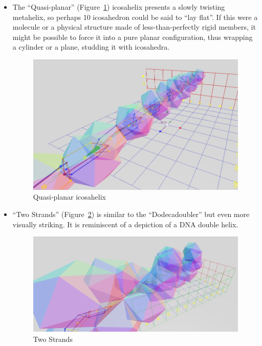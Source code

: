 \documentclass[mathematics,article,submit,pdftex,moreauthors]{Definitions/mdpi}
\begin{document}
\begin{itemize}
\item The ``Quasi-planar'' (Figure~\ref{fig:quasiplanar}) icosahelix presents a slowly twisting metahelix, so perhaps 10 icosahedron could be said to ``lay flat''. If this were
  a molecule or a physical structure made of less-than-perfectly rigid members, it might be possible to force it into a pure planar configuration,
  thus wrapping a cylinder or a plane, studding it with icosahedra.
\begin{figure}
  \centering
  \captionsetup{justification=centering}
     \includegraphics[width=10 cm]{figures/Planar.png}
     \caption{Quasi-planar icosahelix}
  \label{fig:quasiplanar}
\end{figure}
\unskip

\item ``Two Strands'' (Figure~\ref{fig:twostrands}) is similar to the ``Dodecadoubler'' but even more
  visually striking. It is reminiscent of a depiction of a DNA double
  helix.
\begin{figure}
  \centering
  \captionsetup{justification=centering}
     \includegraphics[width=10 cm]{figures/TwoStrands.png}
     \caption{Two Strands}
  \label{fig:twostrands}
\end{figure}
\unskip


\end{itemize}
\end{document}
